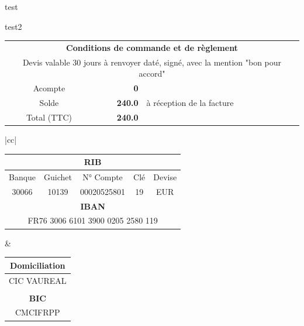 \documentclass[11pt,french]{article}
\def\total{240.0}
\def\deposit{0}
\def\totalLeft{240.0}
\begin{document}
test

test2

\vfill
\begin{center}
\begin{tabular}{|crl|}
	\hline
	\multicolumn{3}{|c|}{\textbf{Conditions de commande et de règlement}} \\
	\multicolumn{3}{|c|}{Devis valable 30 jours à renvoyer daté, signé, avec la mention "bon pour accord"} \\
	Acompte & \textbf{\deposit \EUR} & \\
	Solde &	\textbf{\total \EUR} & à réception de la facture \\
	Total (TTC) & \textbf{\totalLeft \EUR} & \\
	\hline
\end{tabular}
\begin{tabular}{|cc|}
	\hline
	\begin{minipage}{10cm}
	\begin{center}
		\begin{tabular}{ccccc}
		 	\multicolumn{5}{c}{\textbf{RIB}} \\
		 	\hline
			Banque & Guichet & N° Compte & Clé & Devise \\
			30066  & 10139 & 00020525801 & 19 & EUR \\ 
			\multicolumn{5}{c}{\textbf{IBAN}} \\
			\hline
			\multicolumn{5}{c}{FR76 3006 6101 3900 0205 2580 119}
		\end{tabular}
	\end{center}
	\end{minipage} &
	\begin{minipage}{7cm}
	\begin{center}
	\begin{tabular}{c}
		\textbf{Domiciliation} \\ \hline
		CIC VAUREAL \\
		\\
		\textbf{BIC} \\ \hline
		CMCIFRPP
	\end{tabular}
	\end{center}
	\end{minipage} \\ \hline \hline


\end{tabular}
\end{center}
\end{document}
